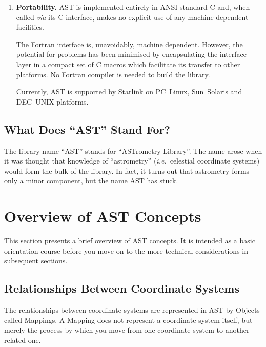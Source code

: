 \documentclass[twoside,11pt]{article}
\newcommand{\htmlref}[2]{#1}
\begin{document}
\begin{enumerate}
\item {\bf{Portability.}}
AST is implemented entirely in ANSI standard C and, when called
{\em{via}} its C interface, makes no explicit use of any
machine-dependent facilities.

The Fortran interface is, unavoidably, machine dependent. However, the
potential for problems has been minimised by encapsulating the
interface layer in a compact set of C macros which facilitate its
transfer to other platforms. No Fortran compiler is needed to build
the library.

Currently, AST is supported by Starlink on PC~Linux, Sun~Solaris and
DEC~UNIX platforms.
\end{enumerate}

\subsection{What Does ``AST'' Stand For?}

The library name ``AST'' stands for ``ASTrometry Library''. The name
arose when it was thought that knowledge of ``astrometry''
({\em{i.e.}}\ celestial coordinate systems) would form the bulk of the
library.  In fact, it turns out that astrometry forms only a minor
component, but the name AST has stuck.

\cleardoublepage
\section{Overview of AST Concepts}

This section presents a brief overview of AST concepts. It is intended
as a basic orientation course before you move on to the more technical
considerations in subsequent sections.

\subsection{\label{ss:mappingoverview}Relationships Between Coordinate Systems}

The relationships between coordinate systems are represented in AST by
Objects called Mappings. A \htmlref{Mapping}{Mapping} does not represent a coordinate
system itself, but merely the process by which you move from one
coordinate system to another related one.
 
\end{document}
